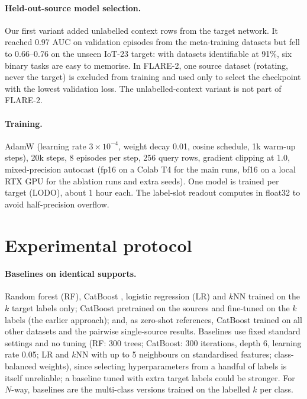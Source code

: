 \documentclass[11pt]{article}
\begin{document}
\paragraph{Held-out-source model selection.}
Our first variant added unlabelled context rows from the target network.
It reached 0.97 AUC on validation episodes from the meta-training datasets but fell to 0.66--0.76 on the unseen IoT-23 target: with datasets identifiable at 91\%, six binary tasks are easy to memorise.
In FLARE-2, one source dataset (rotating, never the target) is excluded from training and used only to select the checkpoint with the lowest validation loss.
The unlabelled-context variant is not part of FLARE-2.

\paragraph{Training.}
AdamW (learning rate $3\times10^{-4}$, weight decay 0.01, cosine schedule, 1k warm-up steps), 20k steps, 8 episodes per step, 256 query rows, gradient clipping at 1.0, mixed-precision autocast (fp16 on a Colab T4 for the main runs, bf16 on a local RTX GPU for the ablation runs and extra seeds).
One model is trained per target (LODO), about 1 hour each.
The label-slot readout computes in float32 to avoid half-precision overflow.

\section{Experimental protocol}
\paragraph{Baselines on identical supports.}
Random forest (RF), CatBoost \citep{prokhorenkova2018catboost}, logistic regression (LR) and $k$NN trained on the $k$ target labels only; CatBoost pretrained on the sources and fine-tuned on the $k$ labels (the earlier approach); and, as zero-shot references, CatBoost trained on all other datasets and the pairwise single-source results.
Baselines use fixed standard settings and no tuning (RF: 300 trees; CatBoost: 300 iterations, depth 6, learning rate 0.05; LR and $k$NN with up to 5 neighbours on standardised features; class-balanced weights), since selecting hyperparameters from a handful of labels is itself unreliable; a baseline tuned with extra target labels could be stronger.
For $N$-way, baselines are the multi-class versions trained on the labelled $k$ per class.
\end{document}
